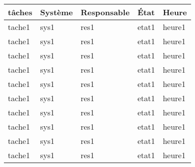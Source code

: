 \Large\begin{tabularx}{\linewidth}{
    |>{\hsize=3.0\hsize}X|%
    >{\hsize=0.5\hsize}X|%
    >{\hsize=0.5\hsize}X|%
    >{\hsize=0.5\hsize}X|%
    >{\hsize=0.5\hsize}X|%
  }
    \hline
    tâches & Système & Responsable & État & Heure\\\hline
    tache1 & sys1 & res1 & etat1 & heure1\\\hline
    tache1 & sys1 & res1 & etat1 & heure1\\\hline
    tache1 & sys1 & res1 & etat1 & heure1\\\hline
    tache1 & sys1 & res1 & etat1 & heure1\\\hline
    tache1 & sys1 & res1 & etat1 & heure1\\\hline
    tache1 & sys1 & res1 & etat1 & heure1\\\hline
    tache1 & sys1 & res1 & etat1 & heure1\\\hline
    tache1 & sys1 & res1 & etat1 & heure1\\\hline
    tache1 & sys1 & res1 & etat1 & heure1\\\hline
    tache1 & sys1 & res1 & etat1 & heure1\\\hline
  \end{tabularx}
     